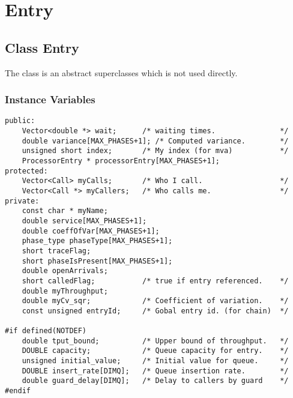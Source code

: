 % 
% 
%
%
%
%
%
%
%
\section{Entry}
\label{sec:entry}

\htmlrule
\subsection{Class Entry}

The class  is an abstract superclasses which is not used
directly.

\subsubsection{Instance Variables}
\label{sec:entry-ivars}

\begin{verbatim}
public:
    Vector<double *> wait;      /* waiting times.               */
    double variance[MAX_PHASES+1]; /* Computed variance.        */
    unsigned short index;       /* My index (for mva)           */
    ProcessorEntry * processorEntry[MAX_PHASES+1];
protected:
    Vector<Call> myCalls;       /* Who I call.                  */
    Vector<Call *> myCallers;   /* Who calls me.                */
private:
    const char * myName;
    double service[MAX_PHASES+1];
    double coeffOfVar[MAX_PHASES+1];
    phase_type phaseType[MAX_PHASES+1];
    short traceFlag;
    short phaseIsPresent[MAX_PHASES+1];
    double openArrivals;
    short calledFlag;           /* true if entry referenced.    */
    double myThroughput;
    double myCv_sqr;            /* Coefficient of variation.    */
    const unsigned entryId;     /* Gobal entry id. (for chain)  */

#if defined(NOTDEF)
    double tput_bound;          /* Upper bound of throughput.   */
    DOUBLE capacity;            /* Queue capacity for entry.    */
    unsigned initial_value;     /* Initial value for queue.     */
    DOUBLE insert_rate[DIMQ];   /* Queue insertion rate.        */
    double guard_delay[DIMQ];   /* Delay to callers by guard    */
#endif
\end{verbatim}

